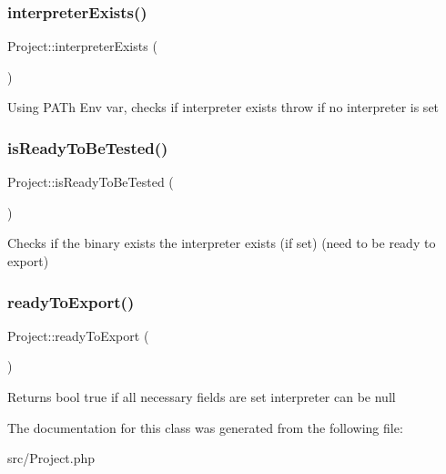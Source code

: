 \subsubsection{\texorpdfstring{interpreter\+Exists()}{interpreterExists()}}
{\footnotesize\ttfamily Project\+::interpreter\+Exists (\begin{DoxyParamCaption}{ }\end{DoxyParamCaption})}

Using P\+A\+Th Env var, checks if interpreter exists throw if no interpreter is set \mbox{\label{classProject_a290cf05d80192d6ea99c119e91631197}} 
\subsubsection{\texorpdfstring{is\+Ready\+To\+Be\+Tested()}{isReadyToBeTested()}}
{\footnotesize\ttfamily Project\+::is\+Ready\+To\+Be\+Tested (\begin{DoxyParamCaption}{ }\end{DoxyParamCaption})}

Checks if the binary exists the interpreter exists (if set) (need to be ready to export) \mbox{\label{classProject_ae494148807f65c817af1e3b0139fee5f}} 
\subsubsection{\texorpdfstring{ready\+To\+Export()}{readyToExport()}}
{\footnotesize\ttfamily Project\+::ready\+To\+Export (\begin{DoxyParamCaption}{ }\end{DoxyParamCaption})}

\begin{DoxyReturn}{Returns}
bool true if all necessary fields are set interpreter can be null 
\end{DoxyReturn}


The documentation for this class was generated from the following file\+:\begin{DoxyCompactItemize}
\item 
src/Project.\+php\end{DoxyCompactItemize}
